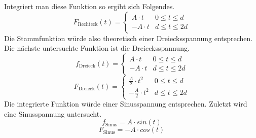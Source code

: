 Integriert man diese Funktion so ergibt sich Folgendes.
\begin{equation}
		F_\text{Rechteck}(t)=\left\{\begin{array}{ll} A \cdot t & 0 \leq t \leq d \\
			-A \cdot t & d \leq t \leq 2d\end{array}\right.
\end{equation}
Die Stammfunktion würde also theoretisch einer Dreiecksspannung entsprechen.
Die nächste untersuchte Funktion ist die Dreiecksspannung.
\begin{equation}
		f_\text{Dreieck}(t)=\left\{\begin{array}{ll} A \cdot t & 0 \leq t \leq d \\
			-A \cdot t & d \leq t \leq 2d\end{array}\right.
\end{equation}
\begin{equation}
		F_\text{Dreieck}(t)=\left\{\begin{array}{ll} \frac{A}{2} \cdot t^2 & 0 \leq t \leq d \\
			-\frac{A}{2} \cdot t^2 & d \leq t \leq 2d\end{array}\right.
\end{equation}
Die integrierte Funktion würde einer Sinusspannung entsprechen.
Zuletzt wird eine Sinusspannung untersucht.
\begin{equation}
	f_\text{Sinus} = A \cdot sin(t)
\end{equation}
\begin{equation}
	F_\text{Sinus} = -A \cdot cos(t)
\end{equation}

